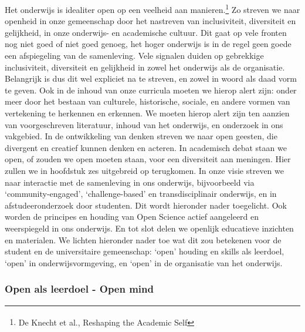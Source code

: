 \documentclass[empirical, authordate, ]{new-jote-article}
\begin{document}
	Het onderwijs is idealiter open op een veelheid aan manieren.\footnote{\textsuperscript{ }De Knecht et al., Reshaping the Academic Self} Zo streven we naar openheid in onze gemeenschap door het nastreven van inclusiviteit, diversiteit en gelijkheid, in onze onderwijs- en academische cultuur. Dit gaat op vele fronten nog niet goed of niet goed genoeg, het hoger onderwijs is in de regel geen goede een afspiegeling van de samenleving. Vele signalen duiden op gebrekkige inclusiviteit, diversiteit en gelijkheid in zowel het onderwijs als de organisatie. Belangrijk is dus dit wel expliciet na te streven, en zowel in woord als daad vorm te geven. Ook in de inhoud van onze curricula moeten we hierop alert zijn: onder meer door het bestaan van culturele, historische, sociale, en andere vormen van vertekening te herkennen en erkennen. We moeten hierop alert zijn ten aanzien van voorgeschreven literatuur, inhoud van het onderwijs, en onderzoek in ons vakgebied. In de ontwikkeling van denken streven we naar open geesten, die divergent en creatief kunnen denken en acteren. In academisch debat staan we open, of zouden we open moeten staan, voor een diversiteit aan meningen. Hier zullen we in hoofdstuk zes uitgebreid op terugkomen. In onze visie streven we naar interactie met de samenleving in ons onderwijs, bijvoorbeeld via ‘community-engaged', ‘challenge-based' en transdisciplinair onderwijs, en in afstudeeronderzoek door studenten. Dit wordt hieronder nader toegelicht. Ook worden de principes en houding van Open Science actief aangeleerd en weerspiegeld in ons onderwijs. En tot slot delen we openlijk educatieve inzichten en materialen. We lichten hieronder nader toe wat dit zou betekenen voor de student en de universitaire gemeenschap: ‘open' houding en skills als leerdoel, ‘open' in onderwijsvormgeving, en ‘open' in de organisatie van het onderwijs.



	\subsubsection{Open als leerdoel - Open mind}
\end{document}
